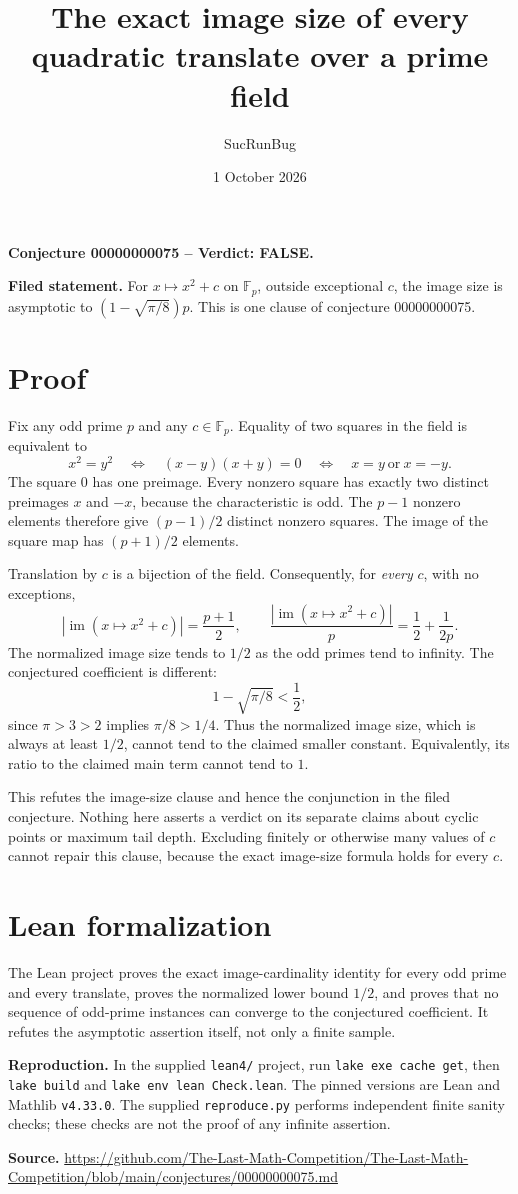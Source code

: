 \documentclass[11pt]{article}
\title{The exact image size of every quadratic translate over a prime field}
\author{SucRunBug}
\date{1 October 2026}
\begin{document}
\maketitle
\textbf{Conjecture 00000000075 -- Verdict: FALSE.}

\textbf{Filed statement.} For $x\mapsto x^2+c$ on $\mathbb F_p$, outside exceptional $c$, the image size is asymptotic to $(1-\sqrt{\pi/8})p$. This is one clause of conjecture 00000000075.

\section*{Proof}
Fix any odd prime $p$ and any $c\in\mathbb F_p$. Equality of two squares in the field is equivalent to
\[x^2=y^2\quad\Longleftrightarrow\quad (x-y)(x+y)=0\quad\Longleftrightarrow\quad x=y\ \text{or}\ x=-y.\]
The square $0$ has one preimage. Every nonzero square has exactly two distinct preimages $x$ and $-x$, because the characteristic is odd. The $p-1$ nonzero elements therefore give $(p-1)/2$ distinct nonzero squares. The image of the square map has $(p+1)/2$ elements.

Translation by $c$ is a bijection of the field. Consequently, for \emph{every} $c$, with no exceptions,
\[|\operatorname{im}(x\mapsto x^2+c)|=\frac{p+1}{2},\qquad
\frac{|\operatorname{im}(x\mapsto x^2+c)|}{p}=\frac12+\frac1{2p}.\]
The normalized image size tends to $1/2$ as the odd primes tend to infinity. The conjectured coefficient is different:
\[1-\sqrt{\pi/8}<\frac12,\]
since $\pi>3>2$ implies $\pi/8>1/4$. Thus the normalized image size, which is always at least $1/2$, cannot tend to the claimed smaller constant. Equivalently, its ratio to the claimed main term cannot tend to $1$.

This refutes the image-size clause and hence the conjunction in the filed conjecture. Nothing here asserts a verdict on its separate claims about cyclic points or maximum tail depth. Excluding finitely or otherwise many values of $c$ cannot repair this clause, because the exact image-size formula holds for every $c$.

\section*{Lean formalization}
The Lean project proves the exact image-cardinality identity for every odd prime and every translate, proves the normalized lower bound $1/2$, and proves that no sequence of odd-prime instances can converge to the conjectured coefficient. It refutes the asymptotic assertion itself, not only a finite sample.

\textbf{Reproduction.} In the supplied \texttt{lean4/} project, run
\texttt{lake exe cache get}, then \texttt{lake build} and
\texttt{lake env lean Check.lean}. The pinned versions are Lean and Mathlib
\texttt{v4.33.0}. The supplied \texttt{reproduce.py} performs independent
finite sanity checks; these checks are not the proof of any infinite assertion.

\textbf{Source.} \url{https://github.com/The-Last-Math-Competition/The-Last-Math-Competition/blob/main/conjectures/00000000075.md}
\end{document}
